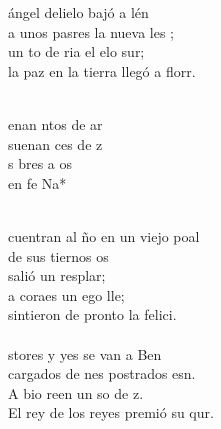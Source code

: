 \begin{cancion}%
	 ángel delielo bajó a lén\\
	a unos pasres la nueva les ;\\
	un to de ria el elo sur; \\
	la paz en la tierra llegó a florr.\\\jump\\
	\begin{chorus}%
	enan ntos de ar\\
	suenan ces de z\\
	 s bres a os\\
	en fe Na*\\
	\end{chorus}%
	\jump\\
	cuentran al ño en un viejo poal\\
	de sus tiernos os \\
	salió un resplar;\\
	a  coraes un ego lle; \\
	sintieron de pronto la felici.\\
\jump\\
	stores y yes se van a Ben \\
	cargados de nes postrados esn.\\
	A bio reen un so de z.\\
	El rey de los reyes premió su qur.\\
\end{cancion}%
